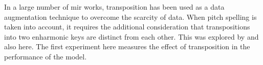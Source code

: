 
In a large number of \gls{mir} works, transposition has been
used as a data augmentation technique to overcome the
scarcity of data. When pitch spelling is taken into account,
it requires the additional consideration that transpositions
into two enharmonic keys are distinct from each other. This
was explored by \textcite{micchi2020not} and also here. The
first experiment here measures the effect of transposition
in the performance of the model.
